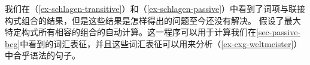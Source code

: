 我们在（\ref{ex-schlagen-transitive}）和（\ref{ex-schlagen-passive}）中看到了词项与联接构式组合的结果，但是这些结果是怎样得出的问题至今还没有解决。 \citet{Kay2002a}假设了最大特定构式所有相容的组合的自动计算。这一程序可以用于计算我们在\ref{sec-passive-bcg}中看到的词汇表征，并且这些词汇表征可以用来分析（\ref{ex-cxg-weltmeister}）中合乎语法的句子。


